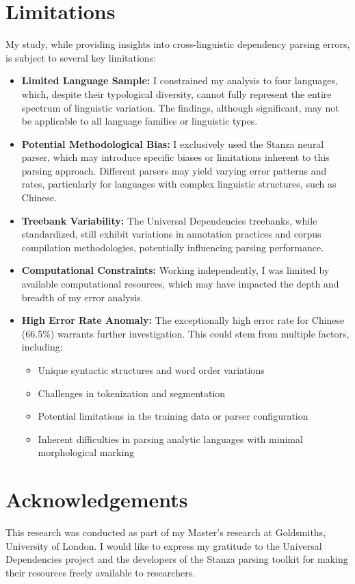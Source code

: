 \documentclass[11pt]{article}
\begin{document}
\section{Limitations}
My study, while providing insights into cross-linguistic dependency parsing errors, is subject to several key limitations:
\begin{itemize}
\item \textbf{Limited Language Sample:} I constrained my analysis to four languages, which, despite their typological diversity, cannot fully represent the entire spectrum of linguistic variation. The findings, although significant, may not be applicable to all language families or linguistic types.
\item \textbf{Potential Methodological Bias:} I exclusively used the Stanza neural parser, which may introduce specific biases or limitations inherent to this parsing approach. Different parsers may yield varying error patterns and rates, particularly for languages with complex linguistic structures, such as Chinese.

\item \textbf{Treebank Variability:} The Universal Dependencies treebanks, while standardized, still exhibit variations in annotation practices and corpus compilation methodologies, potentially influencing parsing performance.

\item \textbf{Computational Constraints:} Working independently, I was limited by available computational resources, which may have impacted the depth and breadth of my error analysis.

\item \textbf{High Error Rate Anomaly:} The exceptionally high error rate for Chinese (66.5\%) warrants further investigation. This could stem from multiple factors, including:
\begin{itemize}
    \item Unique syntactic structures and word order variations
    \item Challenges in tokenization and segmentation
    \item Potential limitations in the training data or parser configuration
    \item Inherent difficulties in parsing analytic languages with minimal morphological marking
\end{itemize}
\end{itemize}

\section{Acknowledgements}
This research was conducted as part of my Master's research at Goldsmiths, University of London. I would like to express my gratitude to the Universal Dependencies project and the developers of the Stanza parsing toolkit for making their resources freely available to researchers.
\end{document}
